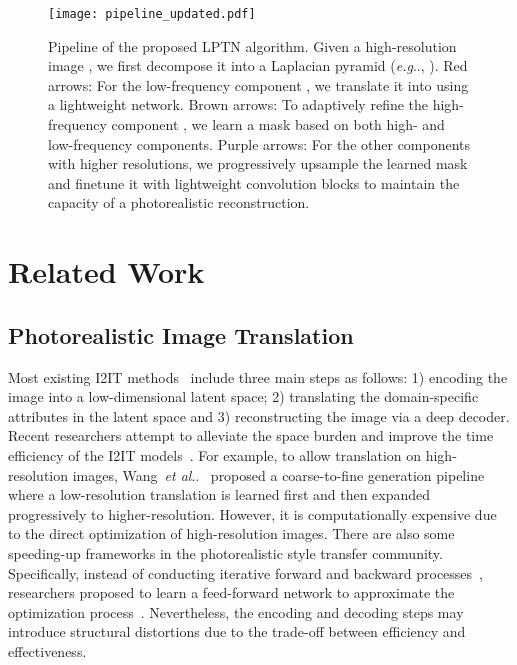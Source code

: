 \documentclass[10pt,twocolumn,letterpaper]{article}
\makeatletter
\DeclareRobustCommand\onedot{\futurelet\@let@token\@onedot}
\def\@onedot{\ifx\@let@token.\else.\null\fi\xspace}
\def\eg{\emph{e.g}\onedot} \def\Eg{\emph{E.g}\onedot}
\def\etal{\emph{et al}\onedot}
\makeatother
\begin{document}
	\begin{figure*}[t]
		\centering
		\texttt{[image: pipeline\_updated.pdf]}
		\caption{Pipeline of the proposed LPTN algorithm.
Given a high-resolution image , we first decompose it into a Laplacian pyramid (\eg, ). \textcolor[rgb]{1,0,0}{Red} arrows: For the low-frequency component , we translate it into  using a lightweight network. \textcolor[rgb]{0.96,0.64,0.39}{Brown} arrows: To adaptively refine the high-frequency component , we learn a mask  based on both high- and low-frequency components. \textcolor[rgb]{0.5,0,0.5}{Purple} arrows: For the other components with higher resolutions, we progressively upsample the learned mask and finetune it with lightweight convolution blocks to maintain the capacity of a photorealistic reconstruction.
			\label{pipeline}}
	\end{figure*}

	\section{Related Work}
	
	\subsection{Photorealistic Image Translation}
	
	Most existing I2IT methods~\cite{isola2017image, gonzalez2018image, lee2018diverse, zhu2017unpaired, liu2017unsupervised, zhu2017toward} include three main steps as follows: 1) encoding the image into a low-dimensional latent space; 2) translating the domain-specific attributes in the latent space and 3) reconstructing the image via a deep decoder. Recent researchers attempt to alleviate the space burden and improve the time efficiency of the I2IT models~\cite{johnson2016perceptual, gharbi2017deep, zhang2017real, huang2017real, chen2017coherent, li2019learning, wang2018high}. For example, to allow translation on high-resolution images, Wang~\etal~\cite{wang2018high} proposed a coarse-to-fine generation pipeline where a low-resolution translation is learned first and then expanded progressively to higher-resolution. However, it is computationally expensive due to the direct optimization of high-resolution images. There are also some speeding-up frameworks in the photorealistic style transfer community. Specifically, instead of conducting iterative forward and backward processes~\cite{gatys2016image}, researchers proposed to learn a feed-forward network to approximate the optimization process~\cite{johnson2016perceptual,chen2017coherent,huang2017real}. Nevertheless, the encoding and decoding steps may introduce structural distortions due to the trade-off between efficiency and effectiveness.
	
\end{document}
